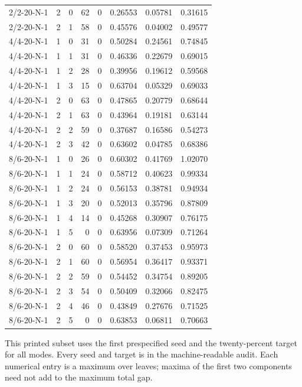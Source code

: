 \begin{longtable}{lrrrrrrr}
2/2-20-N-1 & 2 & 0 & 62 & 0 & 0.26553 & 0.05781 & 0.31615 \\
2/2-20-N-1 & 2 & 1 & 58 & 0 & 0.45576 & 0.04002 & 0.49577 \\
4/4-20-N-1 & 1 & 0 & 31 & 0 & 0.50284 & 0.24561 & 0.74845 \\
4/4-20-N-1 & 1 & 1 & 31 & 0 & 0.46336 & 0.22679 & 0.69015 \\
4/4-20-N-1 & 1 & 2 & 28 & 0 & 0.39956 & 0.19612 & 0.59568 \\
4/4-20-N-1 & 1 & 3 & 15 & 0 & 0.63704 & 0.05329 & 0.69033 \\
4/4-20-N-1 & 2 & 0 & 63 & 0 & 0.47865 & 0.20779 & 0.68644 \\
4/4-20-N-1 & 2 & 1 & 63 & 0 & 0.43964 & 0.19181 & 0.63144 \\
4/4-20-N-1 & 2 & 2 & 59 & 0 & 0.37687 & 0.16586 & 0.54273 \\
4/4-20-N-1 & 2 & 3 & 42 & 0 & 0.63602 & 0.04785 & 0.68386 \\
8/6-20-N-1 & 1 & 0 & 26 & 0 & 0.60302 & 0.41769 & 1.02070 \\
8/6-20-N-1 & 1 & 1 & 24 & 0 & 0.58712 & 0.40623 & 0.99334 \\
8/6-20-N-1 & 1 & 2 & 24 & 0 & 0.56153 & 0.38781 & 0.94934 \\
8/6-20-N-1 & 1 & 3 & 20 & 0 & 0.52013 & 0.35796 & 0.87809 \\
8/6-20-N-1 & 1 & 4 & 14 & 0 & 0.45268 & 0.30907 & 0.76175 \\
8/6-20-N-1 & 1 & 5 & 0 & 0 & 0.63956 & 0.07309 & 0.71264 \\
8/6-20-N-1 & 2 & 0 & 60 & 0 & 0.58520 & 0.37453 & 0.95973 \\
8/6-20-N-1 & 2 & 1 & 60 & 0 & 0.56954 & 0.36417 & 0.93371 \\
8/6-20-N-1 & 2 & 2 & 59 & 0 & 0.54452 & 0.34754 & 0.89205 \\
8/6-20-N-1 & 2 & 3 & 54 & 0 & 0.50409 & 0.32066 & 0.82475 \\
8/6-20-N-1 & 2 & 4 & 46 & 0 & 0.43849 & 0.27676 & 0.71525 \\
8/6-20-N-1 & 2 & 5 & 0 & 0 & 0.63853 & 0.06811 & 0.70663 \\
\end{longtable}
\endgroup
{\footnotesize This printed subset uses the first prespecified seed and the twenty-percent target for all modes. Every seed and target is in the machine-readable audit. Each numerical entry is a maximum over leaves; maxima of the first two components need not add to the maximum total gap.}
